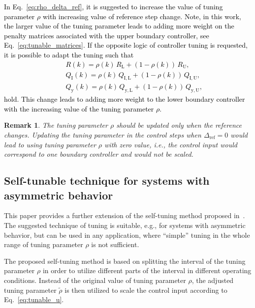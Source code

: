 \documentclass[preprint,12pt]{elsarticle}
\newcommand{\change}[1]{\textcolor{black}{#1}}
\newtheorem{remark}[theorem]{Remark}
\begin{document}
	\change{In Eq.~\eqref{eq:rho_delta_ref}, it is suggested to increase the value of tuning parameter $\rho$ with increasing value of reference step change. Note, in this work, the larger value of the tuning parameter leads to adding more weight on the penalty matrices associated with the upper boundary controller, see Eq.~\eqref{eq:tunable_matrices}. If the opposite logic of controller tuning is requested, it is possible to adapt the tuning such that 
	\begin{eqnarray}
		\label{eq:tunable_R_2}
		&~& R(k) = \rho(k) \, R_\mathrm{L} + (1-\rho(k)) \, R_\mathrm{U}, \\
		\label{eq:tunable_Qx_2}
		&~& Q_\mathrm{I}(k) = \rho(k) \, Q_\mathrm{I,L} + (1-\rho(k)) \, Q_\mathrm{I,U}, \\
		\label{eq:tunable_Qy_2}
		&~& Q_\mathrm{y}(k) = \rho(k) \, Q_\mathrm{y,L} + (1-\rho(k)) \, Q_\mathrm{y,U},
	\end{eqnarray}
	hold. This change leads to adding more weight to the lower boundary controller with the increasing value of the tuning parameter $\rho$.}
	
	\begin{remark}
		The tuning parameter $\rho$ should be updated only when the reference changes. Updating the tuning parameter in the control steps when $\Delta_{\mathrm{ref}} = 0$ would lead to using tuning parameter $\rho$ with zero value, i.e., the control input would correspond to one boundary controller and would not be scaled.
	\end{remark}
	
	
	\subsection{Self-tunable technique for systems with asymmetric behavior}
	\label{sec:self_tunable_rho_scaling}
	
	This paper provides a further extension of the self-tuning method proposed in~\cite{self_tunable}. The suggested technique of tuning is suitable, e.g., for systems with asymmetric behavior, but can be used in any application, where ``simple'' tuning in the whole range of tuning parameter $\rho$ is not sufficient.
	
	The proposed self-tuning method is based on splitting the interval of the tuning parameter $\rho$ in order to utilize different parts of the interval in different operating conditions. Instead of the original value of tuning parameter $\rho$, the adjusted tuning parameter $\widetilde{\rho}$ is then utilized to scale the control input according to Eq.~\eqref{eq:tunable_u}.
	
\end{document}

